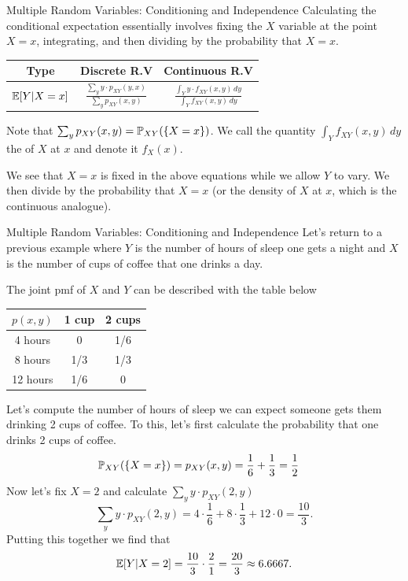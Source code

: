 \documentclass[notheorems,9pt]{beamer}
\begin{document}
\begin{frame}{Multiple Random Variables: Conditioning and Independence} 
	\label{frame:mrv-conditioning-formula}
	Calculating the conditional expectation	essentially involves fixing the \(X\) variable at the point \(X=x\), integrating, and then dividing by the probability that \(X=x\).
	{\large 
		\begin{table}[htpb]
		\renewcommand{\arraystretch}{1.5}
		\centering
		\begin{tabular}{c|cc}
			Type  & Discrete R.V & Continuous R.V \\
			\hline
			\(\E[Y|X=x]\) & \( \frac{\sum_y y\cdot p_{XY}(y,x)}{\sum_y p_{XY}(x,y)}\) & \( \frac{\int_Y y\cdot f_{XY}(x,y)\,dy}{\int_Y f_{XY}(x,y)\,dy}\)
		\end{tabular}
		\end{table}}
	\begin{remark}[]
		Note that \(\sum_y p_{XY}(x,y) = \P_{XY}(\{X=x\})\). We call the quantity \(\int_Y f_{XY}(x,y)\,dy\) the  of \(X\) at \(x\) and denote it \(f_X(x)\).
	\end{remark}
	We see that \(X=x\) is fixed in the above equations while we allow \(Y\) to vary. We then divide by the probability that \(X=x\) (or the density of \(X\) at \(x\), which is the continuous analogue).
	
\end{frame}
\begin{frame}{Multiple Random Variables: Conditioning and Independence} 
	\label{frame:mrv-conditioning-example}
	Let's return to a previous example where \(Y\) is the number of hours of sleep one gets a night and \(X\) is the number of cups of coffee that one drinks a day. 
	
	The joint pmf of \(X\) and \(Y\) can be described with the table below
	\begin{table}[htpb]
		\centering
		\begin{tabular}{c|cc}
			\(p(x,y)\) & 1 cup  & 2 cups\\
			\hline
			4 hours & 0 & 1/6 \\
			8 hours & 1/3 & 1/3 \\
			12 hours & 1/6 & 0
		\end{tabular}
	\end{table}
	Let's compute the number of hours of sleep we can expect someone gets  them drinking 2 cups of coffee. To this, let's first calculate the probability that one drinks 2 cups of coffee.
	\onslide<3->
	\begin{align*}
		\P_{XY}(\{X=x\}) &=p_{XY}(x,y) = \frac{1}{6} + \frac{1}{3} = \frac{1}{2} 
	\end{align*}
	\onslide<4->
	Now let's fix \(X=2\) and calculate \(\sum_y y\cdot p_{XY}(2,y)\)
	\[
		\sum_y y\cdot p_{XY}(2,y) = 4\cdot \frac{1}{6} + 8\cdot\frac{1}{3} + 12\cdot 0 = \frac{10}{3}   
	.\] 
	\onslide<5->
	Putting this together we find that
	\[
		\E[Y|X=2] = \frac{10}{3}\cdot\frac{2}{1} = \frac{20}{3} \approx 6.6667
	.\] 
\end{frame}
\end{document}
